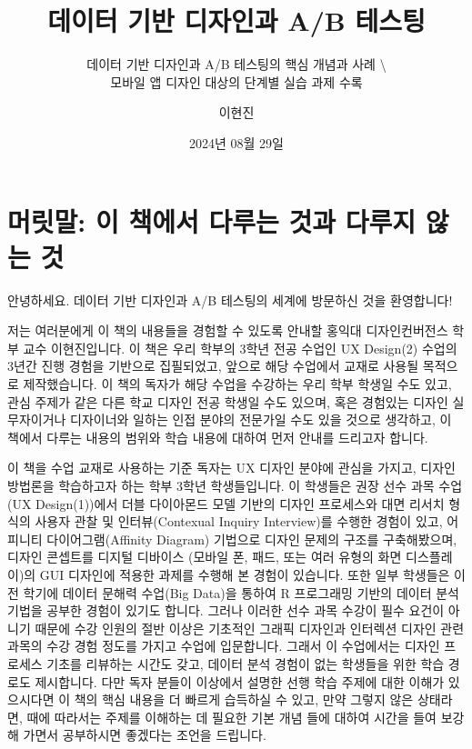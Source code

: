 \documentclass[
  letterpaper,
]{book}
\title{데이터 기반 디자인과 A/B 테스팅}
\subtitle{데이터 기반 디자인과 A/B 테스팅의 핵심 개념과 사례
\textbackslash{}\\
모바일 앱 디자인 대상의 단계별 실습 과제 수록}
\author{이현진}
\date{2024년 08월 29일}
\renewcommand*\contentsname{목차}
\newcommand\contentsname{목차}
\begin{document}
\frontmatter
\maketitle

\renewcommand*\contentsname{목차}
{
\hypersetup{linkcolor=}
\setcounter{tocdepth}{1}
\tableofcontents
}

\mainmatter
{}

\chapter*{머릿말: 이 책에서 다루는 것과 다루지 않는
것}\label{uxba38uxb9bfuxb9d0-uxc774-uxcc45uxc5d0uxc11c-uxb2e4uxb8e8uxb294-uxac83uxacfc-uxb2e4uxb8e8uxc9c0-uxc54auxb294-uxac83}


안녕하세요. 데이터 기반 디자인과 A/B 테스팅의 세계에 방문하신 것을
환영합니다!

저는 여러분에게 이 책의 내용들을 경험할 수 있도록 안내할 홍익대
디자인컨버전스 학부 교수 이현진입니다. 이 책은 우리 학부의 3학년 전공
수업인 UX Design(2) 수업의 3년간 진행 경험을 기반으로 집필되었고, 앞으로
해당 수업에서 교재로 사용될 목적으로 제작했습니다. 이 책의 독자가 해당
수업을 수강하는 우리 학부 학생일 수도 있고, 관심 주제가 같은 다른 학교
디자인 전공 학생일 수도 있으며, 혹은 경험있는 디자인 실무자이거나
디자이너와 일하는 인접 분야의 전문가일 수도 있을 것으로 생각하고, 이
책에서 다루는 내용의 범위와 학습 내용에 대하여 먼저 안내를 드리고자
합니다.

이 책을 수업 교재로 사용하는 기준 독자는 UX 디자인 분야에 관심을 가지고,
디자인 방법론을 학습하고자 하는 학부 3학년 학생들입니다. 이 학생들은
권장 선수 과목 수업(UX Design(1))에서 더블 다이아몬드 모델 기반의 디자인
프로세스와 대면 리서치 형식의 사용자 관찰 및 인터뷰(Contexual Inquiry
Interview)를 수행한 경험이 있고, 어피니티 다이어그램(Affinity Diagram)
기법으로 디자인 문제의 구조를 구축해봤으며, 디자인 콘셉트를 디지털
디바이스 (모바일 폰, 패드, 또는 여러 유형의 화면 디스플레이)의 GUI
디자인에 적용한 과제를 수행해 본 경험이 있습니다. 또한 일부 학생들은
이전 학기에 데이터 문해력 수업(Big Data)을 통하여 R 프로그래밍 기반의
데이터 분석 기법을 공부한 경험이 있기도 합니다. 그러나 이러한 선수 과목
수강이 필수 요건이 아니기 때문에 수강 인원의 절반 이상은 기초적인 그래픽
디자인과 인터렉션 디자인 관련 과목의 수강 경험 정도를 가지고 수업에
입문합니다. 그래서 이 수업에서는 디자인 프로세스 기초를 리뷰하는 시간도
갖고, 데이터 분석 경험이 없는 학생들을 위한 학습 경로도 제시합니다. 다만
독자 분들이 이상에서 설명한 선행 학습 주제에 대한 이해가 있으시다면 이
책의 핵심 내용을 더 빠르게 습득하실 수 있고, 만약 그렇지 않은 상태라면,
때에 따라서는 주제를 이해하는 데 필요한 기본 개념 들에 대하여 시간을
들여 보강해 가면서 공부하시면 좋겠다는 조언을 드립니다.
\end{document}
